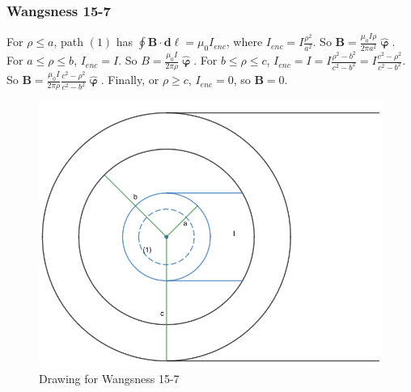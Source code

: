 \documentclass[crop=false,class=book,oneside]{standalone}
\begin{document}
            \subsubsection{Wangsness 15-7}
            For $\rho\leq a$, path $(1)$ has $\oint \mathbf{B}\cdot \mathbf{d\ell}= \mu_0 I_{enc}$, where $I_{enc} = I\frac{\rho^2}{a^2}$. So $\mathbf{B} = \frac{\mu_0 I\rho}{2\pi a^2} \hat{\boldsymbol{\upvarphi}}$. For $a\leq \rho \leq b$, $I_{enc} = I$. So $B = \frac{\mu_0 I}{2\pi \rho} \hat{\boldsymbol{\upvarphi}}$. For $b\leq \rho \leq c$, $I_{enc} = I =I\frac{\rho^2-b^2}{c^2-b^2} = I\frac{c^2-\rho^2}{c^2-b^2}$. So $\mathbf{B} = \frac{\mu_0 I}{2\pi \rho} \frac{c^2-\rho^2}{c^2-b^2}\hat{\boldsymbol{\upvarphi}}$. Finally, or $\rho \geq c$, $I_{enc} = 0$, so $\mathbf{B} = 0$.
            \begin{figure}[htbp]
                \centering
                \captionsetup{type=figure}
                \includegraphics[scale=0.4]{15-7.png}
                \caption{Drawing for Wangsness 15-7}
            \end{figure}
\end{document}
